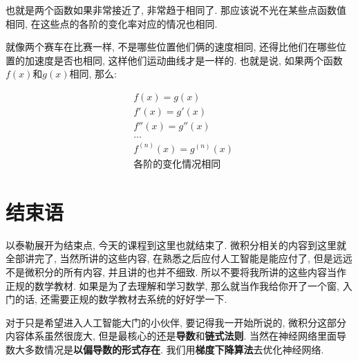 也就是两个函数如果非常接近了, 非常趋于相同了. 那应该说不光在某些点函数值相同, 在这些点的各阶的变化率对应的情况也相同. 

就像两个赛车在比赛一样, 不是哪些位置他们俩的速度相同, 还得比他们在哪些位置的加速度是否也相同, 这样他们运动曲线才是一样的. 也就是说, 如果两个函数$f(x)$和$g(x)$相同, 那么: 

\begin{align*}
  & f(x) = g(x) \\
  & f'(x) = g'(x) \\
  & f''(x) = g''(x) \\
  & ... \\
  & f^{(n)}(x) = g^{(n)}(x) \\
  & \mbox{各阶的变化情况相同}
\end{align*}

\section{结束语}

以泰勒展开为结束点, 今天的课程到这里也就结束了. 微积分相关的内容到这里就全部讲完了, 当然所讲的这些内容, 在熟悉之后应付人工智能是能应付了, 但是远远不是微积分的所有内容, 并且讲的也并不细致. 所以不要将我所讲的这些内容当作正规的数学教材. 如果是为了去理解和学习数学, 那么就当作我给你开了一个窗, 入门的话, 还需要正规的数学教材去系统的好好学一下. 

对于只是希望进入人工智能大门的小伙伴, 要记得我一开始所说的, 微积分这部分内容体系虽然很庞大, 但是最核心的还是\textbf{导数}和\textbf{链式法则}. 当然在神经网络里面导数大多数情况是\textbf{以偏导数的形式存在}. 我们用\textbf{梯度下降算法}去优化神经网络. 